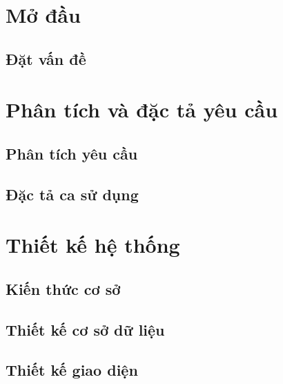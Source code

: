 \documentclass{report}
\begin{document}
\tableofcontents{}
\clearpage{}

\listoffigures{}

\listoftables{}

\chapter{Mở đầu}

\section{Đặt vấn đề}


\chapter{Phân tích và đặc tả yêu cầu}

\section{Phân tích yêu cầu}


\section{Đặc tả ca sử dụng}


\chapter{Thiết kế hệ thống}

\section{Kiến thức cơ sở}


% 

\section{Thiết kế cơ sở dữ liệu}


\section{Thiết kế giao diện}

\end{document}
